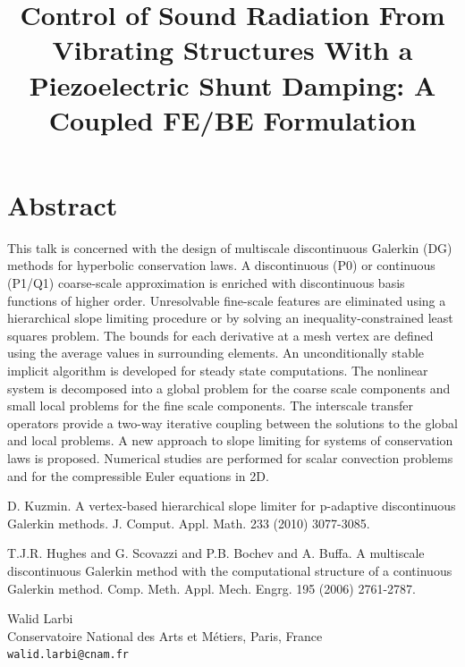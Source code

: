 \documentclass[article, A4, 11pt]{llncs}%
\begin{document}
\section*{Abstract}
This talk is concerned with the design of multiscale discontinuous Galerkin (DG) methods for hyperbolic conservation laws. A discontinuous (P0) or continuous (P1/Q1) coarse-scale approximation is enriched with discontinuous basis functions of higher order. Unresolvable fine-scale features are eliminated using a hierarchical slope limiting procedure or by solving an inequality-constrained least squares problem. The bounds for each derivative at a mesh vertex are defined using the average values in surrounding elements. An unconditionally stable implicit algorithm is developed for steady state computations. The nonlinear system is decomposed into a global problem for the coarse scale components and small local problems for the fine scale components. The interscale transfer operators provide a two-way iterative coupling between the solutions to the global and local problems. A new approach to slope limiting for systems of conservation laws is proposed. Numerical studies are performed for scalar convection problems and for the compressible Euler equations in 2D.



\begin{thebibliography}{10}
{\sc D. Kuzmin}. { A vertex-based hierarchical slope limiter for p-adaptive discontinuous Galerkin methods}.  J.  Comput.  Appl.  Math.  233  (2010) 3077-3085.

{\sc  T.J.R. Hughes and G. Scovazzi and P.B. Bochev and A. Buffa}. {A multiscale discontinuous Galerkin  method with the computational structure of a continuous Galerkin method}. Comp.  Meth.  Appl.  Mech.  Engrg.  195  (2006) 2761-2787.
\end{thebibliography} %

\title{Control of Sound Radiation From Vibrating Structures With a Piezoelectric Shunt Damping: A Coupled FE/BE Formulation}
 \author{} \institute{}
\maketitle
\begin{center}
{\large Walid Larbi}\\
Conservatoire National des Arts et M\'{e}tiers, Paris, France\\
{\tt walid.larbi@cnam.fr}
\end{center}
\end{document}
